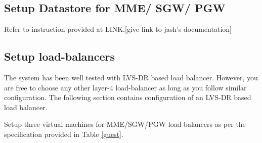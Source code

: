 \pdfminorversion=4\documentclass[hidelinks]{report}
\begin{document}
\subsection*{Setup Datastore for MME/ SGW/ PGW}

Refer to instruction provided at LINK.[give link to jash's documentation]


\subsection*{Setup load-balancers}
\label{sds}
The system has been well tested with LVS-DR based load balancer. However, you are free to choose any other layer-4 load-balancer as long as you follow similar configuration. The following section contains configuration of an LVS-DR based load balancer.

Setup three virtual machines for MME/SGW/PGW load balancers as per the specification provided in Table \ref{guest}.
\end{document}
